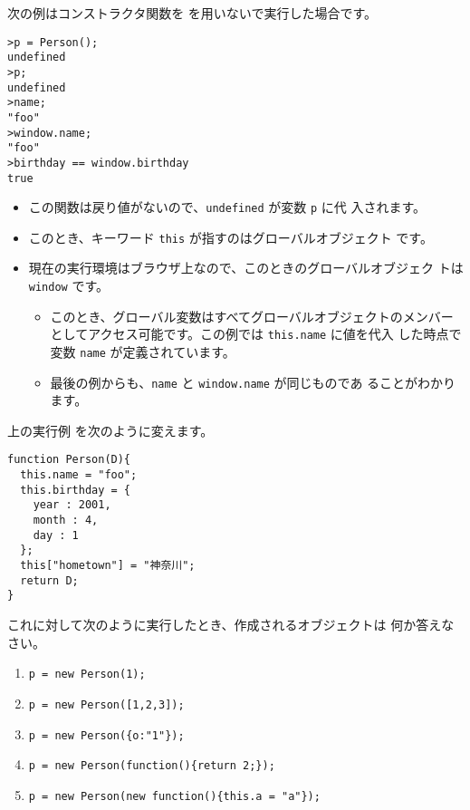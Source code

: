 次の例はコンストラクタ関数を  を用いないで実行した場合です。
\begin{Verbatim}
>p = Person();
undefined
>p;
undefined
>name;
"foo"
>window.name;
"foo"
>birthday == window.birthday
true
\end{Verbatim}
\begin{itemize}
 \item この関数は戻り値がないので、\verb+undefined+ が変数 \verb+p+ に代
       入されます。
 \item このとき、キーワード \verb+this+ が指すのはグローバルオブジェクト
       です。
 \item 現在の実行環境はブラウザ上なので、このときのグローバルオブジェク
       トは \verb+window+ です。
 \begin{itemize}
  \item このとき、グローバル変数はすべてグローバルオブジェクトのメンバー
	としてアクセス可能です。この例では \verb+this.name+ に値を代入
	した時点で変数 \verb+name+ が定義されています。
  \item 最後の例からも、\verb+name+ と \verb+window.name+ が同じものであ
	ることがわかります。
 \end{itemize}
\end{itemize}
%
\iffalse
\begin{Problem}
\verb+window+ オブジェクトにはどのようなプロパティがあるか調べよ。2つ以
 上のブラウザで実行し、比較すること。
\end{Problem}
\fi
\iffalse
\begin{Verbatim}
>person.name;
"foo"
>person.birthday;
Object {year: 2001, month: 4, day: 1}
>person.birthday.year;
2001
>person.hometown;
"神奈川"
>person.hometown ="北海道";
"北海道"
>person.hometown;
"北海道"
>person.mother;
undefined
>person.mother="aaa";
"aaa"
>person.mother;
"aaa"
\end{Verbatim}
\fi
\begin{Problem}\upshape
 上の実行例%
 を次のように変えます。
\begin{Verbatim}
function Person(D){
  this.name = "foo";
  this.birthday = {
    year : 2001,
    month : 4,
    day : 1
  };
  this["hometown"] = "神奈川";
  return D;
}
\end{Verbatim}
これに対して次のように実行したとき、作成されるオブジェクトは
 何か答えなさい。
\begin{enumerate}
 \item \verb+p = new Person(1);+
 \item \verb+p = new Person([1,2,3]);+
 \item \verb+p = new Person({o:"1"});+
 \item \verb+p = new Person(function(){return 2;});+
 \item \verb+p = new Person(new function(){this.a = "a"});+
\end{enumerate}
\end{Problem}

